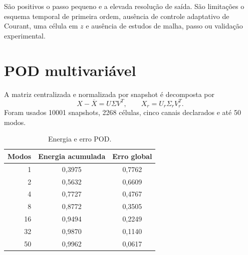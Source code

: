 \documentclass[12pt,a4paper]{article}
\begin{document}
São positivos o passo pequeno e a elevada resolução de saída. São limitações o esquema temporal de primeira ordem, ausência de controle adaptativo de Courant, uma célula em $z$ e ausência de estudos de malha, passo ou validação experimental.

\section{POD multivariável}
A matriz centralizada e normalizada por snapshot é decomposta por
\begin{equation}X-\overline X=U\Sigma V^T,\qquad X_r=U_r\Sigma_rV_r^T.\end{equation}
Foram usados 10001 snapshots, 2268 células, cinco canais declarados e até 50 modos.

\begin{table}[H]\centering\caption{Energia e erro POD.}\label{tab:pod}
\begin{tabular}{rcc}\toprule Modos&Energia acumulada&Erro global\\\midrule
1&0,3975&0,7762\\2&0,5632&0,6609\\4&0,7727&0,4767\\8&0,8772&0,3505\\16&0,9494&0,2249\\32&0,9870&0,1140\\50&0,9962&0,0617\\\bottomrule\end{tabular}\end{table}
\end{document}
